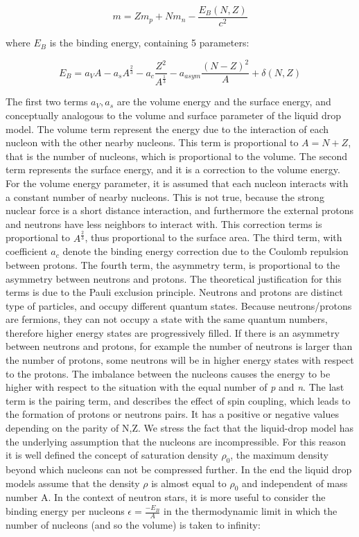 \begin{equation}
m = Zm_{p} + Nm_{n} - \frac{E_{B}(N,Z)}{c^{2}}
\end{equation}

where $E_{B}$ is the binding energy, containing 5 parameters:

\begin{equation}
E_{B} = a_{V}A -  a_{s}A^{\frac{2}{3}} - a_{c}\dfrac{Z^{2}}{A^{\frac{1}{3}}} -a_{asym}\dfrac{(N - Z)^{2}}{A} + \delta(N,Z)
\end{equation}

The first two terms $a_{V},a_{s}$ are the volume energy and the surface energy, and conceptually analogous to the volume and surface parameter of the liquid drop model. The volume term represent the energy due to the interaction of each nucleon with the other nearby nucleons. This term is proportional to $A = N + Z$, that is the number of nucleons, which is proportional to the volume. The second term represents the surface energy, and it is a correction to the volume energy. For the volume energy parameter, it is assumed that each nucleon interacts with a constant number of nearby nucleons. This is not true, because the strong nuclear force is a short distance interaction, and furthermore the external protons and neutrons have less neighbors to interact with. This correction terms is proportional to $A^{\frac{2}{3}}$, thus proportional to the surface area. 
The third term, with coefficient $a_{c}$ denote the binding energy correction due to the Coulomb repulsion between protons. The fourth term, the asymmetry term, is proportional to the asymmetry between neutrons and protons. The theoretical justification for this terms is due to the Pauli exclusion principle. Neutrons and protons are distinct type of particles, and occupy different quantum states. Because neutrons/protons are fermions, they can not occupy a state with the same quantum numbers, therefore higher energy states are progressively filled. If there is an asymmetry between neutrons and protons, for example the number of neutrons is larger than the number of protons, some neutrons will be in higher energy states with respect to the protons. The imbalance between the nucleons causes the energy to be higher with respect to the situation with the equal number of \textit{p} and \textit{n}. 
The last term is the pairing term, and describes the effect of spin coupling, which leads to the formation of protons or neutrons pairs. It has a positive or negative values depending on the parity of N,Z. 
We stress the fact that the liquid-drop model has the underlying assumption that the nucleons are incompressible. For this reason it is well defined the concept of saturation density $\rho_{0}$, the maximum density beyond which nucleons can not be compressed further. In the end the liquid drop models assume that the density $\rho$ is almost equal to $\rho_{0}$ and independent of mass number A. In the context of neutron stars, it is more useful to consider the binding energy per nucleons $\epsilon = \frac{-E_{B}}{A}$ in the thermodynamic limit in which the number of nucleons (and so the volume) is taken to infinity:

